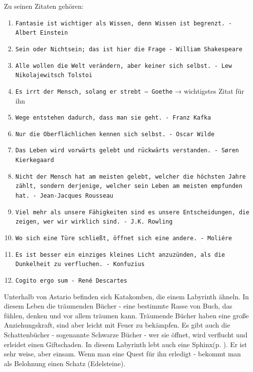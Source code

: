 \documentclass[11pt, twoside]{article}
\begin{document}
Zu seinen Zitaten gehören:
\begin{enumerate}
\item \texttt{Fantasie ist wichtiger als Wissen, denn Wissen ist begrenzt. - Albert Einstein}
\item \texttt{Sein oder Nichtsein; das ist hier die Frage - William Shakespeare}
\item \texttt{Alle wollen die Welt verändern, aber keiner sich selbst. - Lew Nikolajewitsch Tolstoi}
\item \texttt{Es irrt der Mensch, solang er strebt – Goethe} →  wichtigstes Zitat für ihn
\item \texttt{Wege entstehen dadurch, dass man sie geht. - Franz Kafka}
\item \texttt{Nur die Oberflächlichen kennen sich selbst. - Oscar Wilde}
\item \texttt{Das Leben wird vorwärts gelebt und rückwärts verstanden. - Søren Kierkegaard}
\item \texttt{Nicht der Mensch hat am meisten gelebt, welcher die höchsten Jahre zählt, sondern derjenige, welcher sein Leben am meisten empfunden hat. - Jean-Jacques Rousseau}
\item \texttt{Viel mehr als unsere Fähigkeiten sind es unsere Entscheidungen, die zeigen, wer wir wirklich sind. - J.K. Rowling}
\item \texttt{Wo sich eine Türe schließt, öffnet sich eine andere. - Moliére}
\item \texttt{Es ist besser ein einziges kleines Licht anzuzünden, als die Dunkelheit zu verfluchen. - Konfuzius}
\item \texttt{Cogito ergo sum - René Descartes}
\end{enumerate}

Unterhalb von Astario befinden sich Katakomben, die einem Labyrinth ähneln. In diesem Leben die träumenden Bücher - eine bestimmte Rasse von Buch, das fühlen, denken und vor allem träumen kann. Träumende Bücher haben eine große Anziehungskraft, sind aber leicht mit Feuer zu bekämpfen. Es gibt auch die Schattenbücher - sogenannte Schwarze Bücher - wer sie öffnet, wird verflucht und erleidet einen Giftschaden. In diesem Labyrinth lebt auch eine Sphinx(p. \pageref{sphinx}). Er ist sehr weise, aber einsam. Wenn man eine Quest für ihn erledigt - bekommt man als Belohnung einen Schatz (Edelsteine).
\end{document}
